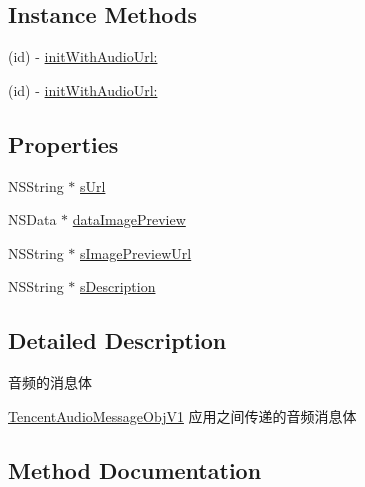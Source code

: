 \subsection*{Instance Methods}
\begin{DoxyCompactItemize}
\item 
(id) -\/ \mbox{\hyperlink{interface_tencent_audio_message_obj_v1_ac106008b2a775e6cffe3e4f780ca300b}{init\+With\+Audio\+Url\+:}}
\item 
(id) -\/ \mbox{\hyperlink{interface_tencent_audio_message_obj_v1_ac106008b2a775e6cffe3e4f780ca300b}{init\+With\+Audio\+Url\+:}}
\end{DoxyCompactItemize}
\subsection*{Properties}
\begin{DoxyCompactItemize}
\item 
N\+S\+String $\ast$ \mbox{\hyperlink{interface_tencent_audio_message_obj_v1_ac25346a91c4facd12f3ed0c6bdf59035}{s\+Url}}
\item 
N\+S\+Data $\ast$ \mbox{\hyperlink{interface_tencent_audio_message_obj_v1_a9b064a8a301e9f72aa43902fe8238652}{data\+Image\+Preview}}
\item 
N\+S\+String $\ast$ \mbox{\hyperlink{interface_tencent_audio_message_obj_v1_a0e06f2bf07a855da66f71faa20ec7900}{s\+Image\+Preview\+Url}}
\item 
N\+S\+String $\ast$ \mbox{\hyperlink{interface_tencent_audio_message_obj_v1_ab875f2db4a42391f3c09f7dc410452c3}{s\+Description}}
\end{DoxyCompactItemize}


\subsection{Detailed Description}
音频的消息体 

\mbox{\hyperlink{interface_tencent_audio_message_obj_v1}{Tencent\+Audio\+Message\+Obj\+V1}} 应用之间传递的音频消息体 

\subsection{Method Documentation}
\mbox{\label{interface_tencent_audio_message_obj_v1_ac106008b2a775e6cffe3e4f780ca300b}} 
